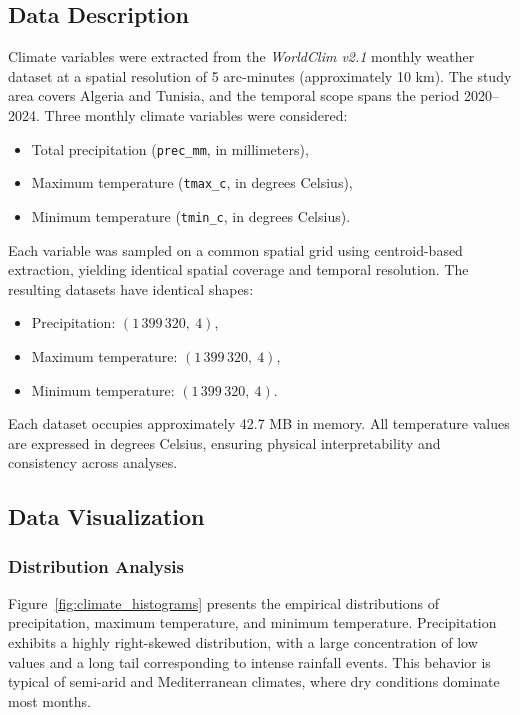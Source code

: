\subsection{Data Description}\label{subsec:climate_description}

Climate variables were extracted from the \textit{WorldClim v2.1} monthly weather dataset at a spatial resolution of 5 arc-minutes (approximately 10 km). The study area covers Algeria and Tunisia, and the temporal scope spans the period 2020–2024. Three monthly climate variables were considered:
\begin{itemize}
    \item Total precipitation (\texttt{prec\_mm}, in millimeters),
    \item Maximum temperature (\texttt{tmax\_c}, in degrees Celsius),
    \item Minimum temperature (\texttt{tmin\_c}, in degrees Celsius).
\end{itemize}

Each variable was sampled on a common spatial grid using centroid-based extraction, yielding identical spatial coverage and temporal resolution. The resulting datasets have identical shapes:
\begin{itemize}
    \item Precipitation: $(1\,399\,320,\ 4)$,
    \item Maximum temperature: $(1\,399\,320,\ 4)$,
    \item Minimum temperature: $(1\,399\,320,\ 4)$.
\end{itemize}

Each dataset occupies approximately 42.7 MB in memory. All temperature values are expressed in degrees Celsius, ensuring physical interpretability and consistency across analyses.

\subsection{Data Visualization}\label{subsec:climate_visualization}

\subsubsection{Distribution Analysis}

Figure~\ref{fig:climate_histograms} presents the empirical distributions of precipitation, maximum temperature, and minimum temperature. Precipitation exhibits a highly right-skewed distribution, with a large concentration of low values and a long tail corresponding to intense rainfall events. This behavior is typical of semi-arid and Mediterranean climates, where dry conditions dominate most months.

